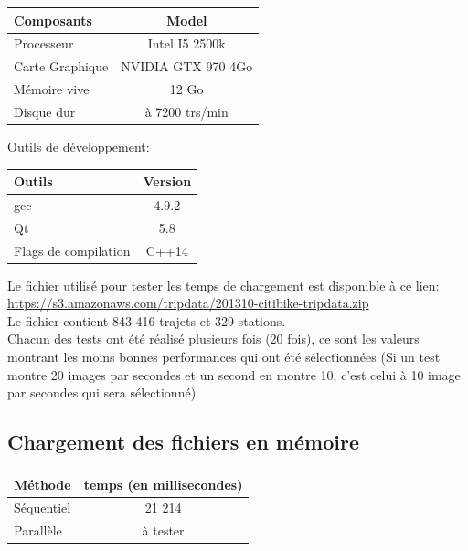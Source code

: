 \documentclass[12pt]{article}
\begin{document}
		\begin{center}
			\begin{tabular}{| l | c |}
			\hline
			\textbf{Composants} & \textbf{Model} \\ \hline
			Processeur & Intel I5 2500k \\ \hline
			Carte Graphique & NVIDIA GTX 970 4Go \\ \hline
			Mémoire vive & 12 Go \\ \hline
			Disque dur & à 7200 trs/min \\ \hline
		    \end{tabular}
	    \end{center}
	    
	    Outils de développement: \\
	    \begin{center}
			\begin{tabular}{| l | c |}
			\hline
			\textbf{Outils} & \textbf{Version} \\ \hline
			gcc & 4.9.2 \\ \hline
			Qt & 5.8 \\ \hline
			Flags de compilation & C++14\\ \hline
		    \end{tabular}
	    \end{center}
	    
	    Le fichier utilisé pour tester les temps de chargement est disponible à ce lien:\\
		\url{https://s3.amazonaws.com/tripdata/201310-citibike-tripdata.zip}\\
		
		Le fichier contient 843 416 trajets et 329 stations. \\
		
		Chacun des tests ont été réalisé plusieurs fois (20 fois), ce
		sont les valeurs montrant les moins bonnes performances qui ont été
		sélectionnées (Si un test montre 20 images par secondes et un second en montre
		10, c'est celui à 10 image par secondes qui sera sélectionné).
	    
		\subsection{Chargement des fichiers en mémoire}		
		\begin{center}
			\begin{tabular}{| l | c |}
			\hline
			\textbf{Méthode} & \textbf{temps (en millisecondes)} \\ \hline
			Séquentiel & 21 214 \\ \hline
			Parallèle & à tester \\ \hline
		    \end{tabular}
	    \end{center}
		
\end{document}

